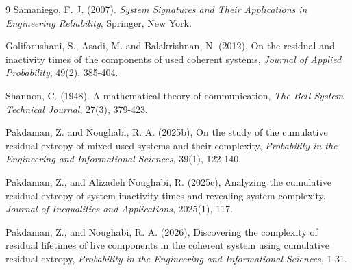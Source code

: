 \documentclass[twoside]{article}
\begin{document}

\begin{thebibliography}{9}
Samaniego, F. J. (2007). {\it System Signatures and Their Applications in Engineering Reliability}, Springer, New York.

Goliforushani, S., Asadi, M. and Balakrishnan, N. (2012), On the residual and inactivity times of the components of used coherent systems, {\it Journal of Applied Probability},  49(2), 385-404.


Shannon, C. (1948). A mathematical theory of communication, {\it The Bell System Technical Journal},  27(3), 379-423.

Pakdaman, Z. and Noughabi, R. A. (2025b), On the study of the cumulative residual extropy of mixed used systems and their complexity, {\it Probability in the Engineering and Informational Sciences},  39(1), 122-140.

Pakdaman, Z., and  Alizadeh Noughabi, R. (2025c), Analyzing the cumulative residual extropy of system inactivity times and revealing system complexity, {\it Journal of Inequalities and Applications},  2025(1), 117.

Pakdaman, Z., and Noughabi, R. A. (2026), Discovering the complexity of residual lifetimes of live components in the coherent system using cumulative residual extropy, {\it Probability in the Engineering and Informational Sciences}, 1-31.

\end{thebibliography}
 
\end{document}
